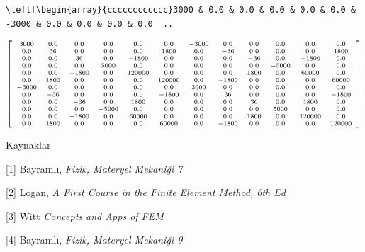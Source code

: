 \documentclass[12pt,fleqn]{article}\usepackage{../../common}
\begin{document}
\begin{verbatim}
\left[\begin{array}{cccccccccccc}3000 & 0.0 & 0.0 & 0.0 & 0.0 & 0.0 & -3000 & 0.0 & 0.0 & 0.0 & 0.0  ..
\end{verbatim}

$$
{\scriptsize
\left[\begin{array}{cccccccccccc}3000 & 0.0 & 0.0 & 0.0 & 0.0 & 0.0 & -3000 & 0.0 & 0.0 & 0.0 & 0.0 & 0.0\\0.0 & 36 & 0.0 & 0.0 & 0.0 & 1800 & 0.0 & -36 & 0.0 & 0.0 & 0.0 & 1800\\0.0 & 0.0 & 36 & 0.0 & -1800 & 0.0 & 0.0 & 0.0 & -36 & 0.0 & -1800 & 0.0\\0.0 & 0.0 & 0.0 & 5000 & 0.0 & 0.0 & 0.0 & 0.0 & 0.0 & -5000 & 0.0 & 0.0\\0.0 & 0.0 & -1800 & 0.0 & 120000 & 0.0 & 0.0 & 0.0 & 1800 & 0.0 & 60000 & 0.0\\0.0 & 1800 & 0.0 & 0.0 & 0.0 & 120000 & 0.0 & -1800 & 0.0 & 0.0 & 0.0 & 60000\\-3000 & 0.0 & 0.0 & 0.0 & 0.0 & 0.0 & 3000 & 0.0 & 0.0 & 0.0 & 0.0 & 0.0\\0.0 & -36 & 0.0 & 0.0 & 0.0 & -1800 & 0.0 & 36 & 0.0 & 0.0 & 0.0 & -1800\\0.0 & 0.0 & -36 & 0.0 & 1800 & 0.0 & 0.0 & 0.0 & 36 & 0.0 & 1800 & 0.0\\0.0 & 0.0 & 0.0 & -5000 & 0.0 & 0.0 & 0.0 & 0.0 & 0.0 & 5000 & 0.0 & 0.0\\0.0 & 0.0 & -1800 & 0.0 & 60000 & 0.0 & 0.0 & 0.0 & 1800 & 0.0 & 120000 & 0.0\\0.0 & 1800 & 0.0 & 0.0 & 0.0 & 60000 & 0.0 & -1800 & 0.0 & 0.0 & 0.0 & 120000\end{array}\right]
}
$$


Kaynaklar

[1] Bayramlı, {\em Fizik, Materyel Mekaniği 7}

[2] Logan, {\em A First Course in the Finite Element Method, 6th Ed}

[3] Witt {\em Concepts and Apps of FEM}

[4] Bayramlı, {\em Fizik, Materyel Mekaniği 9}
\end{document}
